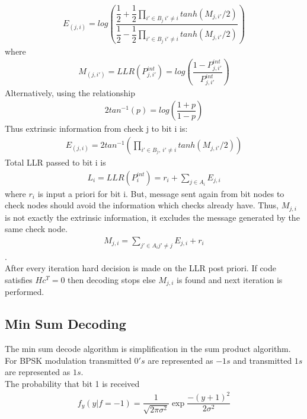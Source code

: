 \begin{align} E_{(j,i)} = log
\left(
\dfrac{\dfrac{1}{2}+\dfrac{1}{2} \prod_{i'\in B_j \ i'\neq i }tanh(M_{j,i'}/2) }{\dfrac{1}{2}-\dfrac{1}{2} \prod_{i'\in B_j \ i'\neq i }tanh(M_{j,i'}/2) } 
\right)
\end{align}
where 
\begin{align} M_{(j,i')} =  LLR (P_{j,i'}^{int}) = log \left(
\dfrac{1-P_{j,i'}^{int}}{P_{j,i'}^{int}} 
\right)
\end{align}
Alternatively, using the relationship
\begin{align} 2tan^{-1}(p)=log \left( \dfrac{1+p}{1-p} \right) \end{align}
Thus extrinsic information from check j to bit i is:
\begin{align} E_{(j,i)} = 2tan^{-1} \left( \prod_{i'\in B_j ,\ i'\neq i }tanh(M_{j,i'}/2) \right) \end{align}
Total LLR passed to bit i is
\begin{align} L_i = LLR(P_i^{int}) = r_i + \sum_{j\in A_i} E_{j,i} \end{align}
where $r_i$ is input a priori for bit i.
But, message sent again from bit nodes to check nodes should avoid the information which checks already have. Thus,
$M_{j,i}$ is not exactly the extrinsic information, it excludes the message generated by the same check node.\\
\begin{align}  M_{j,i} = \sum_{j'\in A_i j'\neq j} E_{j,i} + r_i \end{align}.\\
After every iteration hard decision is made on the LLR post priori. If code satisfies $Hc^T=0$ then decoding stops else $M_{j,i}$ is found and next iteration is performed.

\subsection{Min Sum Decoding}
The min sum decode algorithm is simplification in the sum product algorithm. \\
For BPSK modulation transmitted $0's$ are represented as $-1s$ and transmitted $1s$ are represented as $1s$. \\
The probability that bit 1 is received 
\begin{align} f_y(y|f=-1) = \dfrac{1}{\sqrt{2\pi\sigma^{2}}} \exp{\dfrac{-(y+1)^2}{2\sigma^2}}
 \end{align}
 

